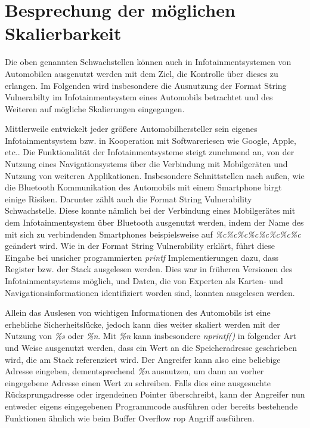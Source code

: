 \documentclass[a4paper,
DIV=13,
12pt,
BCOR=10mm,
department=FakIM,
oneside,
parskip=half,
automark,
listof=totocnumbered,
bibliography=totocnumbered,
acronym=totocnumbered
] {OTHRartcl}
\begin{document}
\newpage
\section{Besprechung der möglichen Skalierbarkeit}
Die oben genannten Schwachstellen können auch in Infotainmentsystemen von Automobilen ausgenutzt werden mit dem Ziel, die Kontrolle über dieses zu erlangen.
Im Folgenden wird insbesondere die Ausnutzung der Format String Vulnerabilty im Infotainmentsystem eines Automobils betrachtet und des Weiteren auf mögliche Skalierungen eingegangen.

Mittlerweile entwickelt jeder größere Automobilhersteller sein eigenes Infotainmentsystem bzw. in Kooperation mit Softwareriesen wie Google, Apple, etc..
Die Funktionalität der Infotainmentsysteme steigt zunehmend an, von der Nutzung eines Navigationsystems über die Verbindung mit Mobilgeräten und Nutzung von weiteren Applikationen.
Insbesondere Schnittstellen nach außen, wie die Bluetooth Kommunikation des Automobils mit einem Smartphone birgt einige Risiken.
Darunter zählt auch die Format String Vulnerability Schwachstelle. Diese konnte nämlich bei der Verbindung eines Mobilgerätes mit dem Infotainmentsystem über Bluetooth
ausgenutzt werden, indem der Name des mit sich zu verbindenden Smartphones beispielsweise auf \textit{\%c\%c\%c\%c\%c\%c\%c\%c} geändert wird.
Wie in der Format String Vulnerability erklärt, führt diese Eingabe bei unsicher programmierten \textit{printf} Implementierungen dazu, dass Register bzw. der Stack ausgelesen werden.
Dies war in früheren Versionen des Infotainmentsystems möglich, und Daten, die von Experten als Karten- und Navigationsinformationen identifiziert worden sind, konnten ausgelesen werden.

Allein das Auslesen von wichtigen Informationen des Automobils ist eine erhebliche Sicherheitslücke, jedoch kann dies weiter skaliert werden mit der Nutzung von \textit{\%s} oder \textit{\%n}.
Mit \textit{\%n} kann insbesondere \textit{nprintf()} in folgender Art und Weise ausgenutzt werden, dass ein Wert an die Speicheradresse geschrieben wird, die am Stack referenziert wird.
Der Angreifer kann also eine beliebige Adresse eingeben, dementsprechend \textit{\%n} ausnutzen, um dann an vorher eingegebene Adresse einen Wert zu schreiben.
Falls dies eine ausgesuchte Rücksprungadresse oder irgendeinen Pointer überschreibt, kann der Angreifer nun entweder eigens eingegebenen Programmcode ausführen oder bereits bestehende Funktionen
ähnlich wie beim Buffer Overflow \ac{rop} Angriff ausführen.
\end{document}
